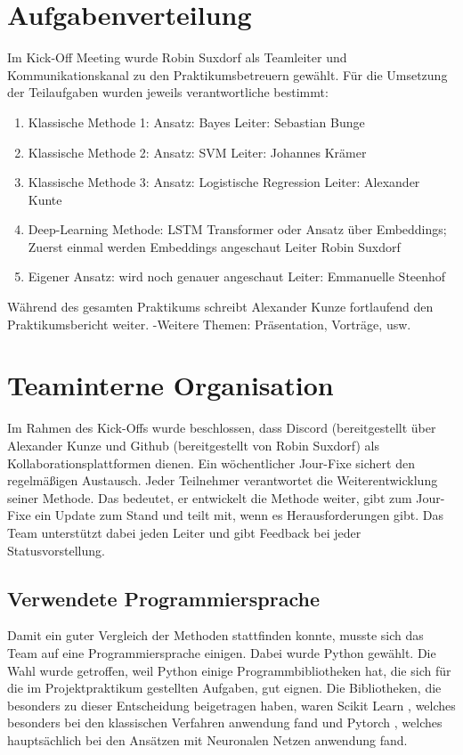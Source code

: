 \documentclass[researchlab,palatino]{AIGpaper}
\begin{document}
\section{Aufgabenverteilung}
Im Kick-Off Meeting wurde Robin Suxdorf als Teamleiter und Kommunikationskanal zu den Praktikumsbetreuern gewählt.  Für die Umsetzung der Teilaufgaben wurden jeweils verantwortliche bestimmt:
\begin{enumerate}
    \item Klassische Methode 1: Ansatz: Bayes Leiter: Sebastian Bunge
    \item Klassische Methode 2: Ansatz: SVM Leiter: Johannes Krämer
    \item Klassische Methode 3: Ansatz: Logistische Regression Leiter: Alexander Kunte
    \item Deep-Learning Methode: LSTM Transformer oder Ansatz über Embeddings; Zuerst einmal werden Embeddings angeschaut Leiter Robin Suxdorf
    \item Eigener Ansatz: wird noch genauer angeschaut Leiter: Emmanuelle Steenhof
\end{enumerate}
Während des gesamten Praktikums schreibt Alexander Kunze fortlaufend den Praktikumsbericht weiter.
-Weitere Themen: Präsentation, Vorträge, usw. 
\section{Teaminterne Organisation}
Im Rahmen des Kick-Offs wurde beschlossen, dass Discord (bereitgestellt über Alexander Kunze und Github (bereitgestellt von Robin Suxdorf) als Kollaborationsplattformen dienen. Ein wöchentlicher Jour-Fixe sichert den regelmäßigen Austausch. Jeder Teilnehmer verantwortet die Weiterentwicklung seiner Methode. Das bedeutet, er entwickelt die Methode weiter, gibt zum Jour-Fixe ein Update zum Stand und teilt mit, wenn es Herausforderungen gibt. Das Team unterstützt dabei jeden Leiter und gibt Feedback bei jeder Statusvorstellung.
\subsection{Verwendete Programmiersprache}
Damit ein guter Vergleich der Methoden stattfinden konnte, musste sich das Team auf eine Programmiersprache einigen. Dabei wurde Python gewählt. Die Wahl wurde getroffen, weil Python einige Programmbibliotheken hat, die sich für die im Projektpraktikum gestellten Aufgaben, gut eignen. Die Bibliotheken, die besonders zu dieser Entscheidung beigetragen haben, waren Scikit Learn \cite{skicitLearnRef}, welches besonders bei den klassischen Verfahren anwendung fand und Pytorch \cite{pytorchRef}, welches hauptsächlich bei den Ansätzen mit Neuronalen Netzen anwendung fand.
\end{document}
